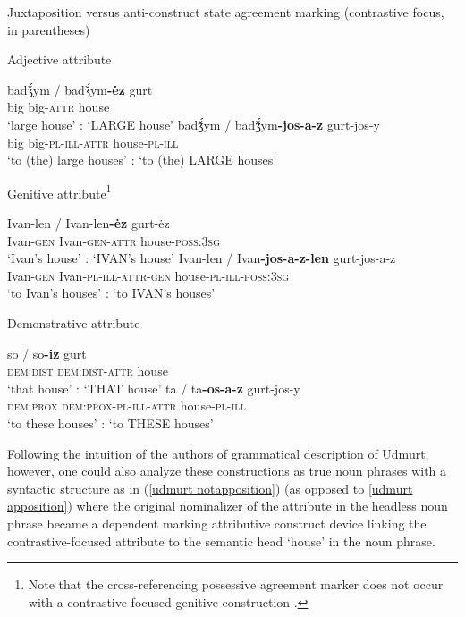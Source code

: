 \begin{exe}
\ex Juxtaposition versus anti-construct state agreement marking (contrastive focus, in parentheses) \citep{kelmakov-etal1999,winkler2001}
\begin{xlist}
\ex	Adjective attribute
\begin{xlist}
\ex 	
\gll	badǯ́ym / badǯ́ym\textbf{-ėz} gurt\\
	big {} big-\textsc{attr} house\\
\glt	‘large house’ : ‘LARGE house’
\ex	
\gll	badǯ́ym / badǯ́ym\textbf{-jos-a-z} gurt-jos-y\\
	big {} big-\textsc{pl}-\textsc{ill}-\textsc{attr} house-\textsc{pl}-\textsc{ill}\\
\glt	‘to (the) large houses’ : ‘to (the) LARGE houses’
\end{xlist}
\ex	Genitive attribute\footnote{Note that the cross-referencing possessive agreement marker does not occur with a contrastive-focused genitive construction \citep[81]{kelmakov-etal1999}.}
\begin{xlist}
\ex	
\gll	Ivan-len / Ivan-len\textbf{-ėz} gurt-ėz\\
	Ivan-\textsc{gen} {} Ivan-\textsc{gen}-\textsc{attr} house-\textsc{poss:3sg}\\
\glt	‘Ivan's house’ : ‘IVAN's house’
\ex	
\gll	Ivan-len / Ivan\textbf{-jos-a-z-len} gurt-jos-a-z\\
	Ivan-\textsc{gen} {} Ivan-\textsc{pl}-\textsc{ill}-\textsc{attr}-\textsc{gen} house-\textsc{pl}-\textsc{ill}-\textsc{poss:3sg}\\
\glt	‘to Ivan's houses’ : ‘to IVAN's houses’
\end{xlist}
\ex	Demonstrative attribute \label{udmurt det dem}
\begin{xlist}
\ex	
\gll	so / so\textbf{-iz} gurt\\
 	\textsc{dem:dist} {} \textsc{dem:dist}-\textsc{attr} house\\
\glt	‘that house’ : ‘THAT house’
\ex 	
\gll	ta / ta\textbf{-os-a-z} gurt-jos-y\\
	\textsc{dem:prox} {} \textsc{dem:prox}-\textsc{pl}-\textsc{ill}-\textsc{attr} house-\textsc{pl}-\textsc{ill}\\
\glt	 ‘to these houses’ : ‘to THESE houses’
\end{xlist}
\end{xlist}
\end{exe}
Following the intuition of the authors of grammatical description of Udmurt, however, one could also analyze these constructions as true noun phrases with a syntactic structure as in (\ref{udmurt notapposition}) (as opposed to \ref{udmurt apposition}) where the original nominalizer of the attribute in the headless noun phrase became a dependent marking attributive construct device linking the contrastive-focused attribute to the semantic head ‘house’ in the noun phrase.
